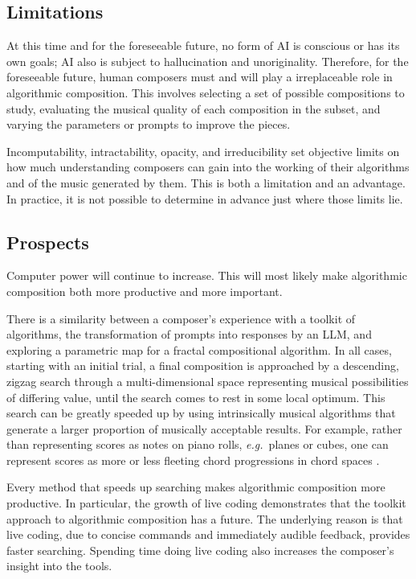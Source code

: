 \documentclass[]{interact}
\theoremstyle{plain}%
\theoremstyle{definition}
\theoremstyle{remark}
\begin{document}
\subsection{Limitations}

At this time and for the foreseeable future, no form of AI is conscious or has its own goals; AI also is subject to hallucination and unoriginality. Therefore, for the foreseeable future, human composers must and will play a irreplaceable role in algorithmic composition. This involves selecting a set of possible compositions to study, evaluating the musical quality of each composition in the subset, and varying the parameters or prompts to improve  the pieces.

Incomputability, intractability, opacity, and irreducibility set objective limits on how much understanding composers can gain into the working of their algorithms and of the music generated by them. This is both a limitation and an advantage. In practice, it is not possible to determine in advance just where those limits lie.

\subsection{Prospects}

Computer power will continue to increase. This will most likely make algorithmic composition both more productive and more important.

There is a similarity between a composer's experience with a toolkit of algorithms, the transformation of prompts into responses by an LLM, and exploring a parametric map for a fractal compositional algorithm. In all cases, starting with an initial trial, a final composition is approached by a descending, zigzag search through a multi-dimensional space representing musical possibilities of differing value, until the search comes to rest in some local optimum. This search can be greatly speeded up by using intrinsically musical algorithms that generate a larger proportion of musically acceptable results. For example, rather than representing scores as notes on piano rolls, \emph{e.g.}\ planes or cubes, one can represent scores as more or less fleeting chord progressions in chord spaces \citep{Anonymous2006score, Anonymous2023scoregraphs}.

Every method that speeds up searching makes algorithmic composition more productive. In particular, the growth of live coding demonstrates that the toolkit approach to algorithmic composition has a future. The underlying reason is that live coding, due to concise commands and immediately audible feedback, provides faster searching. Spending time doing live coding also increases the composer's insight into the tools.
\end{document}
